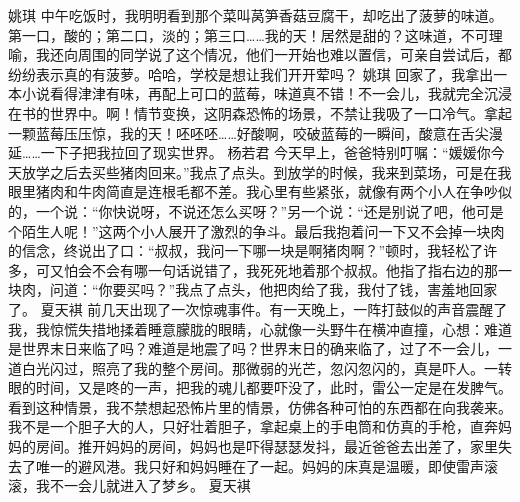 \markdownRendererInterblockSeparator
{}\markdownRendererInterblockSeparator
{}姚琪\markdownRendererInterblockSeparator
{}中午吃饭时，我明明看到那个菜叫莴笋香菇豆腐干，却吃出了菠萝的味道。第一口，酸的；第二口，淡的；第三口……我的天！居然是甜的？这味道，不可理喻，我还向周围的同学说了这个情况，他们一开始也难以置信，可亲自尝试后，都纷纷表示真的有菠萝。哈哈，学校是想让我们开开荤吗？\markdownRendererInterblockSeparator
{}\markdownRendererInterblockSeparator
{}姚琪\markdownRendererInterblockSeparator
{}回家了，我拿出一本小说看得津津有味，再配上可口的蓝莓，味道真不错！不一会儿，我就完全沉浸在书的世界中。啊！情节变换，这阴森恐怖的场景，不禁让我吸了一口冷气。拿起一颗蓝莓压压惊，我的天！呸呸呸……好酸啊，咬破蓝莓的一瞬间，酸意在舌尖漫延……一下子把我拉回了现实世界。\markdownRendererInterblockSeparator
{}\markdownRendererInterblockSeparator
{}杨若君\markdownRendererInterblockSeparator
{}今天早上，爸爸特别叮嘱：“媛媛你今天放学之后去买些猪肉回来。”我点了点头。到放学的时候，我来到菜场，可是在我眼里猪肉和牛肉简直是连根毛都不差。我心里有些紧张，就像有两个小人在争吵似的，一个说：“你快说呀，不说还怎么买呀？”另一个说：“还是别说了吧，他可是个陌生人呢！”这两个小人展开了激烈的争斗。最后我抱着问一下又不会掉一块肉的信念，终说出了口：“叔叔，我问一下哪一块是啊猪肉啊？”顿时，我轻松了许多，可又怕会不会有哪一句话说错了，我死死地着那个叔叔。他指了指右边的那一块肉，问道：“你要买吗？”我点了点头，他把肉给了我，我付了钱，害羞地回家了。\markdownRendererInterblockSeparator
{}\markdownRendererInterblockSeparator
{}夏天褀\markdownRendererInterblockSeparator
{}前几天出现了一次惊魂事件。有一天晚上，一阵打鼓似的声音震醒了我，我惊慌失措地揉着睡意朦胧的眼睛，心就像一头野牛在横冲直撞，心想：难道是世界末日来临了吗？难道是地震了吗？世界末日的确来临了，过了不一会儿，一道白光闪过，照亮了我的整个房间。那微弱的光芒，忽闪忽闪的，真是吓人。一转眼的时间，又是咚的一声，把我的魂儿都要吓没了，此时，雷公一定是在发脾气。看到这种情景，我不禁想起恐怖片里的情景，仿佛各种可怕的东西都在向我袭来。我不是一个胆子大的人，只好壮着胆子，拿起桌上的手电筒和仿真的手枪，直奔妈妈的房间。推开妈妈的房间，妈妈也是吓得瑟瑟发抖，最近爸爸去出差了，家里失去了唯一的避风港。我只好和妈妈睡在了一起。妈妈的床真是温暖，即使雷声滚滚，我不一会儿就进入了梦乡。\markdownRendererInterblockSeparator
{}\markdownRendererInterblockSeparator
{}夏天褀\markdownRendererInterblockSeparator
